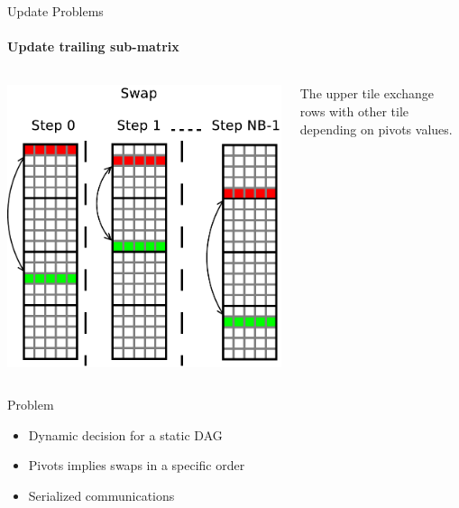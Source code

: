 
\begin{frame}{Update Problems}
\framesubtitle{Update trailing sub-matrix}
\begin{columns}
\begin{column}{.50\textwidth}
\begin{center}
\includegraphics[scale=0.2]{update_swap.pdf}
\end{center}
\end{column}
\hfill
\begin{column}{.50\textwidth}
The upper tile exchange rows with other tile depending on pivots values.
\end{column}
\end{columns}
\pause
\begin{footnotesize}
\begin{exampleblock}{Problem }
\begin{itemize}
\item Dynamic decision for a static DAG
\item Pivots implies swaps in a specific order
\item Serialized communications
\end{itemize}
\end{exampleblock}{}
\end{footnotesize}
\end{frame}

